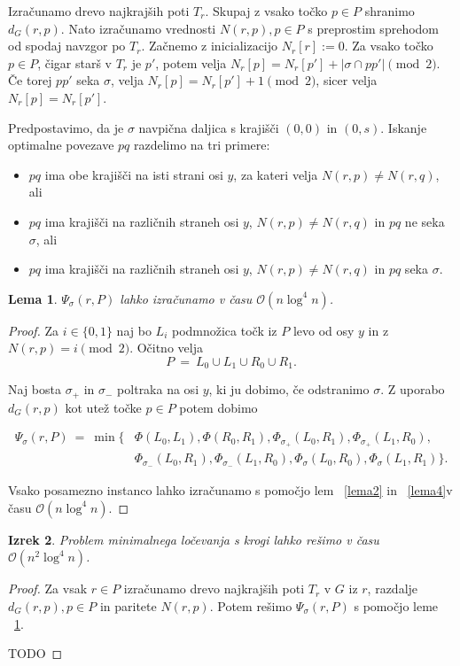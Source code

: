 \documentclass[a4paper, 12pt]{book}
\newcommand{\OO}{\ensuremath{\mathcal{O}}} %
\newtheorem{izrek}{Izrek}[chapter]
\newtheorem{lema}[izrek]{Lema}
\begin{document}
Izračunamo drevo najkrajših poti $T_r$. Skupaj z vsako točko $p\in P$ shranimo $d_G(r,p)$. Nato izračunamo vrednosti $N(r,p), p\in P$ s preprostim sprehodom od spodaj navzgor po $T_r$. Začnemo z inicializacijo $N_r[r] := 0$. Za vsako točko $p\in P$, čigar starš v $T_r$ je $p'$, potem velja $N_r[p] = N_r[p'] + |\sigma\cap pp'| \pmod 2$. Če torej $pp'$ seka $\sigma$, velja $N_r[p]=N_r[p']+1 \pmod 2$, sicer velja
$N_r[p]=N_r[p']$.

Predpostavimo, da je $\sigma$ navpična daljica s krajišči $(0,0)$ in $(0,s)$. Iskanje optimalne povezave $pq$ razdelimo na tri primere:

\begin{itemize}
\item $pq$ ima obe krajišči na isti strani osi $y$, za kateri velja $N(r,p) \neq N(r,q)$, ali
\item $pq$ ima krajišči na različnih straneh osi $y$, $N(r,p) \neq N(r,q)$ in $pq$  ne seka $\sigma$, ali
\item $pq$ ima krajišči na različnih straneh osi $y$, $N(r,p) \neq N(r,q)$ in $pq$ seka $\sigma$.
\end{itemize}

\begin{lema}
\label{lema6}
$\Psi_\sigma(r,P)$ lahko izračunamo v času $\OO (n\log^4 n)$.
\end{lema}

\begin{proof}
Za $i\in \{0,1\}$ naj bo $L_i$ podmnožica točk iz $P$ levo od osy $y$ in z $N(r,p) = i \pmod 2$. Očitno velja
\[
		P~=~ L_0\cup L_1\cup R_0\cup R_1.
\]

Naj bosta $\sigma_+$ in $\sigma_-$ poltraka na osi $y$, ki ju dobimo, če odstranimo $\sigma$. Z uporabo $d_G(r,p)$ kot utež točke $p\in P$ potem dobimo

\begin{align*}
		 \Psi_\sigma(r,P) ~=~ \min \{ &\Phi( L_0,L_1), \Phi( R_0,R_1),
										\Phi_{\sigma_+}( L_0,R_1), \Phi_{\sigma_+}( L_1,R_0),\\
										&\Phi_{\sigma_-}( L_0,R_1), \Phi_{\sigma_-}( L_1,R_0),
										\Phi_{\sigma}( L_0,R_0), \Phi_{\sigma}(L_1,R_1) \}.
\end{align*}

Vsako posamezno instanco lahko izračunamo s pomočjo lem ~\ref{lema2} in ~\ref{lema4}v času $\OO (n\log^4 n)$.
\end{proof}

\begin{izrek}
Problem minimalnega ločevanja s krogi lahko rešimo v času $\OO (n^2\log^4 n)$.
\end{izrek}
\begin{proof}
Za vsak $r\in P$ izračunamo drevo najkrajših poti $T_r$ v $G$ iz $r$, razdalje $d_G(r,p), p\in P$ in paritete $N(r,p)$. Potem rešimo $\Psi_\sigma(r,P)$ s pomočjo leme ~\ref{lema6}.

TODO
\end{proof}
\end{document}
